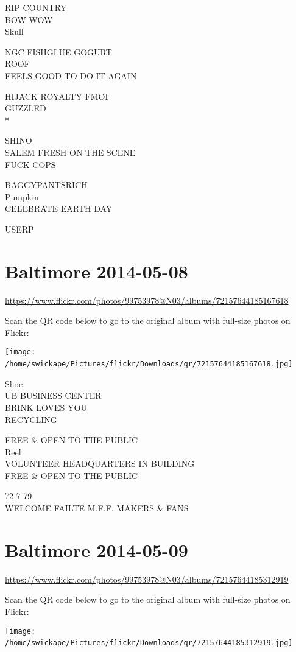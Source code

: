 \documentclass[10pt,letterpaper]{article}
\begin{document}
RIP COUNTRY\\
BOW WOW\\
Skull

NGC FISHGLUE GOGURT\\
ROOF\\
FEELS GOOD TO DO IT AGAIN

HIJACK ROYALTY FMOI\\
GUZZLED\\
*

SHINO\\
SALEM FRESH ON THE SCENE\\
FUCK COPS

BAGGYPANTSRICH\\
Pumpkin\\
CELEBRATE EARTH DAY

USERP
\

\section*{Baltimore 2014-05-08}

\url{https://www.flickr.com/photos/99753978@N03/albums/72157644185167618}

Scan the QR code below to go to the original album with full-size photos on Flickr:

\texttt{[image: /home/swickape/Pictures/flickr/Downloads/qr/72157644185167618.jpg]}
\

Shoe\\
UB BUSINESS CENTER\\
BRINK LOVES YOU\\
RECYCLING

FREE \& OPEN TO THE PUBLIC\\
Reel\\
VOLUNTEER HEADQUARTERS IN BUILDING\\
FREE \& OPEN TO THE PUBLIC

72 7 79\\
WELCOME FAILTE M.F.F. MAKERS \& FANS
\

\section*{Baltimore 2014-05-09}

\url{https://www.flickr.com/photos/99753978@N03/albums/72157644185312919}

Scan the QR code below to go to the original album with full-size photos on Flickr:

\texttt{[image: /home/swickape/Pictures/flickr/Downloads/qr/72157644185312919.jpg]}
\
\end{document}

